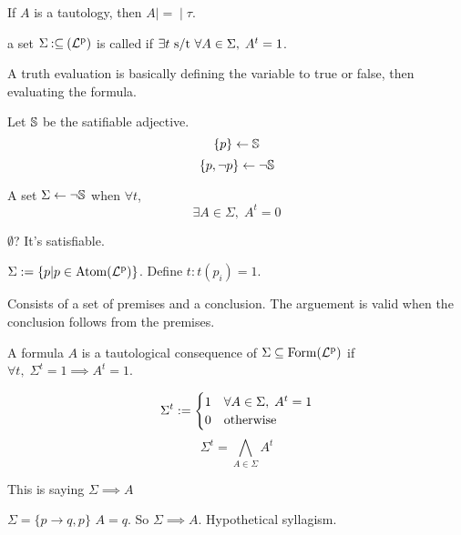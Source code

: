 \documentclass[12pt]{article}
\begin{document}
\bboxnota
\begin{nota}[Tautology]
  If \(A\) is a tautology, then \(A\mathbin{\mid\!=\!\mid}\tau\).
\end{nota}
\ebox


\bbox
\begin{defn}
  a set \(\Sigma\mathbin{:\subseteq}(\mathrm{\mathcal{L}^p_{}})\) is called  if
  \(\exists t\text{ s/t }\forall A\in\Sigma,\;A^t=1\).
\end{defn}
\ebox
A truth evaluation is basically defining the variable to true or false, then
evaluating the formula.
\bboxex
\begin{exam}
  Let \(\mathbb S\) be the satifiable adjective.
  \[\{p\}\leftarrow \mathbb S\]
  \[\{p,\neg p\}\leftarrow \neg \mathbb S\]
\end{exam}
\ebox

\bbox
\begin{defn}
  A set \(\Sigma\leftarrow\neg\mathbb S\) when \(\forall t\), 
  \[\exists A\in\Sigma,\;A^t=0\]
\end{defn}
\ebox

\bboxex
\begin{exam}
  \(\emptyset\)? It's satisfiable.
\end{exam}
\ebox

\bbox
\begin{exam}
  \(\Sigma:=\{p|p\in\mathrm{Atom}(\mathrm{\mathcal{L}^p_{}})\}\). Define \(t:t(p_i)=1\).
\end{exam}
\ebox

\bbox
\begin{defn}[Arguement]
  Consists of a set of premises and a conclusion. The arguement is
  valid when the conclusion follows from the premises.

  A formula \(A\) is a tautological consequence of \(\Sigma\subseteq\mathrm{Form}(\mathrm{\mathcal{L}^p_{}})\)
  if \(\forall t,\;\Sigma^t=1\implies A^t=1\).

  \[
    \Sigma^t:=\begin{cases}1&\forall A\in\Sigma,\;A^t=1\\ 0&\mathrm{otherwise}\end{cases}
  \]
  \[
    \Sigma^t=\bigwedge_{A\in\Sigma}A^t
  \]

  This is saying \(\Sigma\implies A\)
  
\end{defn}
\ebox

\bboxex
\begin{exam}
  \(\Sigma=\{p\to q, p\}\) \(A=q\). So \(\Sigma\implies A\). 
  Hypothetical syllagism.
\end{exam}
\ebox
\end{document}
